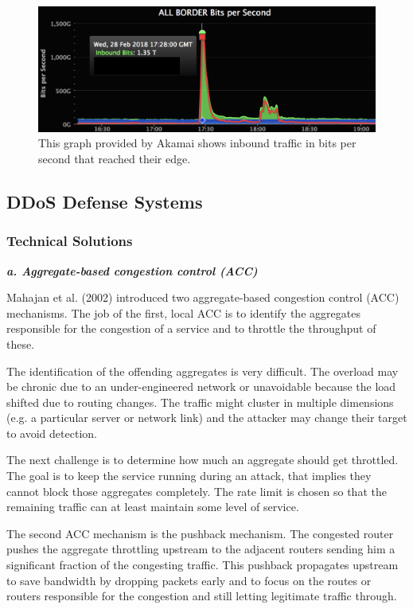 \begin{figure}[ht]
\begin{center} \includegraphics[scale=0.3]{Talk11/github} \end{center}
\caption{This graph provided by Akamai shows inbound traffic in bits per second that reached their edge. \cite{Kottler18}}
\label{fig:github}
\end{figure}

	\subsection{DDoS Defense Systems}
		\subsubsection{Technical Solutions}
\textbf{\textit{a. Aggregate-based congestion control (ACC)}}

Mahajan et al. (2002) introduced two aggregate-based congestion control (ACC) mechanisms. The job of the first, local ACC is to identify the aggregates responsible for the congestion of a service and to throttle the throughput of these. \cite{Mahajan02}

The identification of the offending aggregates is very difficult. The overload may be chronic due to an under-engineered network or unavoidable because the load shifted due to routing changes. The traffic might cluster in multiple dimensions (e.g. a particular server or network link) and the attacker may change their target to avoid detection. \cite{Mahajan02}

The next challenge is to determine how much an aggregate should get throttled. The goal is to keep the service running during an attack, that implies they cannot block those aggregates completely. The rate limit is chosen so that the remaining traffic can at least maintain some level of service. \cite{Mahajan02}

The second ACC mechanism is the pushback mechanism. The congested router pushes the aggregate throttling upstream to the adjacent routers sending him a significant fraction of the congesting traffic. This pushback propagates upstream to save bandwidth by dropping packets early and to focus on the routes or routers responsible for the congestion and still letting legitimate traffic through. \cite{Mahajan02}

